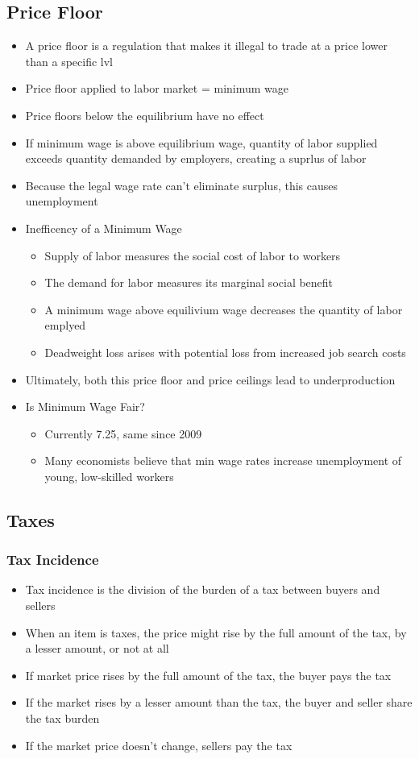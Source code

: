 \documentclass[11pt]{article}
\begin{document}
\subsection{Price Floor}
\label{sec:orgc8f9905}
\begin{itemize}
\item A price floor is a regulation that makes it illegal to trade at a price lower than a specific lvl
\item Price floor applied to labor market = minimum wage
\item Price floors below the equilibrium have no effect
\item If minimum wage is above equilibrium wage, quantity of labor supplied exceeds quantity demanded
by employers, creating a suprlus of labor
\item Because the legal wage rate can't eliminate surplus, this causes unemployment
\item Inefficency of a Minimum Wage
\begin{itemize}
\item Supply of labor measures the social cost of labor to workers
\item The demand for labor measures its marginal social benefit
\item A minimum wage above equilivium wage decreases the quantity of labor emplyed
\item Deadweight loss arises with potential loss from increased job search costs
\end{itemize}
\item Ultimately, both this price floor and price ceilings lead to underproduction
\item Is Minimum Wage Fair?
\begin{itemize}
\item Currently 7.25, same since 2009
\item Many economists believe that min wage rates increase unemployment of young, low-skilled workers
\end{itemize}
\end{itemize}
\subsection{Taxes}
\label{sec:org9fa42ca}
\subsubsection{Tax Incidence}
\label{sec:org3e2af3a}
\begin{itemize}
\item Tax incidence is the division of the burden of a tax between buyers and sellers
\item When an item is taxes, the price might rise by the full amount of the tax, by a lesser amount,
or not at all
\item If market price rises by the full amount of the tax, the buyer pays the tax
\item If the market rises by a lesser amount than the tax, the buyer and seller share the tax burden
\item If the market price doesn't change, sellers pay the tax
\end{itemize}
\end{document}
